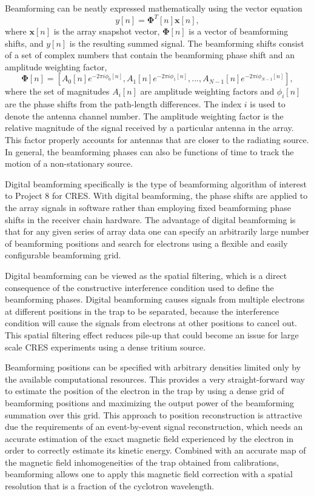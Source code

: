 Beamforming can be neatly expressed mathematically using the vector equation
\begin{equation}
    y[n] = \bm{\Phi}^T[n]\bm{x}[n],
\end{equation}
where $\bm{x}[n]$ is the array snapshot vector, $\bm{\Phi}[n]$ is a vector of beamforming shifts, and $y[n]$ is the resulting summed signal. The beamforming shifts consist of a set of complex numbers that contain the beamforming phase shift and an amplitude weighting factor,
\begin{equation}
    \bm{\Phi}[n] = \left[A_0[n]e^{-2\pi i\phi_0[n]}, A_1[n]e^{-2\pi i \phi_1[n]}, ..., A_{N-1}[n]e^{-2\pi i \phi_{N-1}[n]}\right],
\end{equation}
where the set of magnitudes $A_i[n]$ are amplitude weighting factors and $\phi_i[n]$ are the phase shifts from the path-length differences. The index $i$ is used to denote the antenna channel number. The amplitude weighting factor is the relative magnitude of the signal received by a particular antenna in the array. This factor properly accounts for antennas that are closer to the radiating source. In general, the beamforming phases can also be functions of time to track the motion of a non-stationary source.

Digital beamforming specifically is the type of beamforming algorithm of interest to Project 8 for CRES. With digital beamforming, the phase shifts are applied to the array signals in software rather than employing fixed beamforming phase shifts in the receiver chain hardware. The advantage of digital beamforming is that for any given series of array data one can specify an arbitrarily large number of beamforming positions and search for electrons using a flexible and easily configurable beamforming grid.

Digital beamforming can be viewed as the spatial filtering, which is a direct consequence of the constructive interference condition used to define the beamforming phases. Digital beamforming causes signals from multiple electrons at different positions in the trap to be separated, because the interference condition will cause the signals from electrons at other positions to cancel out. This spatial filtering effect reduces pile-up that could become an issue for large scale CRES experiments using a dense tritium source.

Beamforming positions can be specified with arbitrary densities limited only by the available computational resources. This provides a very straight-forward way to estimate the position of the electron in the trap by using a dense grid of beamforming positions and maximizing the output power of the beamforming summation over this grid. This approach to position reconstruction is attractive due the requirements of an event-by-event signal reconstruction, which needs an accurate estimation of the exact magnetic field experienced by the electron in order to correctly estimate its kinetic energy. Combined with an accurate map of the magnetic field inhomogeneities of the trap obtained from calibrations, beamforming allows one to apply this magnetic field correction with a spatial resolution that is a fraction of the cyclotron wavelength.

